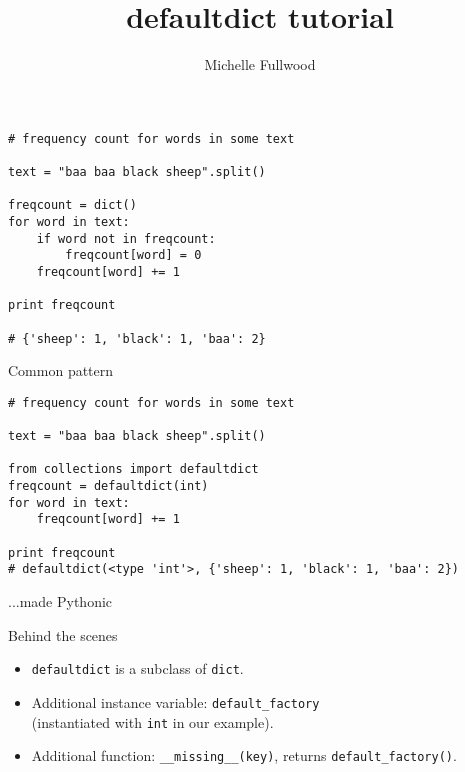 \documentclass{beamer}
\title[defaultdict]{defaultdict tutorial}
\author{Michelle Fullwood}
\date{}
\begin{document}
\begin{frame}
\titlepage
\end{frame}


\begin{lrbox}{\mysavebox}
\begin{lstlisting}
# frequency count for words in some text

text = "baa baa black sheep".split()

freqcount = dict()
for word in text:
    if word not in freqcount:
        freqcount[word] = 0
    freqcount[word] += 1

print freqcount

# {'sheep': 1, 'black': 1, 'baa': 2}

\end{lstlisting}
\end{lrbox}

\begin{frame}{Common pattern}
\vspace{1.5em}
{\usebox{\mysavebox}}
\vspace{1em}
\end{frame}


\begin{lrbox}{\mysavebox}
\begin{lstlisting}
# frequency count for words in some text

text = "baa baa black sheep".split()

from collections import defaultdict
freqcount = defaultdict(int)
for word in text:
    freqcount[word] += 1

print freqcount
# defaultdict(<type 'int'>, {'sheep': 1, 'black': 1, 'baa': 2})
\end{lstlisting}

\end{lrbox}

\begin{frame}{...made Pythonic}
\vspace{1.5em}
{\usebox{\mysavebox}}
\vspace{1em}
\end{frame}

\begin{frame}{Behind the scenes}

\begin{itemize}
  \item \lstinline$defaultdict$ is a subclass of \lstinline$dict$.
  \item Additional instance variable: \lstinline$default_factory$ \\
        (instantiated with \lstinline$int$ in our example).
  \item Additional function:  \lstinline$__missing__(key)$, returns \lstinline$default_factory()$. 
\end{itemize}
\end{frame}
\end{document}
